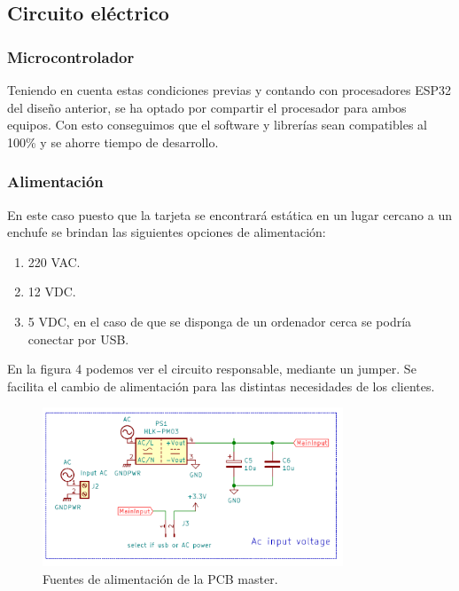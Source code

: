 \documentclass[paper=a4, fontsize=11pt,twoside]{scrartcl}	%
\begin{document}
    \subsection{Circuito eléctrico}
        \subsubsection{Microcontrolador} 
            Teniendo en cuenta estas condiciones previas y contando con procesadores ESP32 del diseño anterior, se ha optado por compartir 
            el procesador para ambos equipos. Con esto conseguimos que el software y librerías sean compatibles al 100\% y se ahorre tiempo
            de desarrollo.
        \subsubsection{Alimentación} 
            En este caso puesto que la tarjeta se encontrará estática en un lugar cercano a un enchufe se brindan las siguientes opciones
            de alimentación:
            \begin{enumerate}
                \item 220 VAC.
                \item 12 VDC.
                \item 5 VDC, en el caso de que se disponga de un ordenador cerca se podría conectar por USB.
            \end{enumerate}
            En la figura 4 podemos ver el circuito responsable, mediante un jumper. Se facilita el cambio de alimentación para las distintas necesidades 
            de los clientes.
            \begin{center}
                \begin{figure}[h]
                    \centering
                    \includegraphics[width=0.8\textwidth]{../receiver_main_power.PNG}
                    \caption{Fuentes de alimentación de la PCB master.}
                    \label{fig:mesh4}
                \end{figure}    
            \end{center}    
\end{document}
